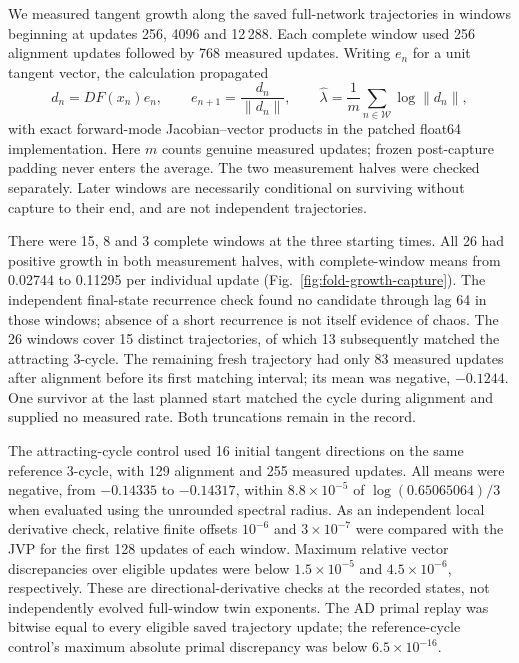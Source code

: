 \documentclass[11pt,letterpaper]{article}
\begin{document}
We measured tangent growth along the saved full-network trajectories in windows beginning at updates
256, 4096 and 12\,288. Each complete window used 256 alignment updates followed by 768 measured updates.
Writing $e_n$ for a unit tangent vector, the calculation propagated
\begin{equation}
 d_n=DF(x_n)e_n,\qquad e_{n+1}=\frac{d_n}{\|d_n\|},\qquad
 \widehat\lambda=\frac1m\sum_{n\in\mathcal W}\log\|d_n\|,
 \label{eq:fgr3-tangent}
\end{equation}
with exact forward-mode Jacobian--vector products in the patched float64 implementation. Here $m$ counts
genuine measured updates; frozen post-capture padding never enters the average. The two measurement halves
were checked separately. Later windows are necessarily conditional on surviving without capture to their
end, and are not independent trajectories.

There were 15, 8 and 3 complete windows at the three starting times. All 26 had positive growth in both
measurement halves, with complete-window means from 0.02744 to 0.11295 per individual update
(Fig.~\ref{fig:fold-growth-capture}). The independent final-state recurrence check found no candidate through
lag 64 in those windows; absence of a short recurrence is not itself evidence of chaos. The 26 windows
cover 15 distinct trajectories, of which 13 subsequently matched the attracting 3-cycle. The remaining
fresh trajectory had only 83 measured updates after alignment before its first matching interval; its
mean was negative, $-0.1244$. One survivor at the last planned start matched the cycle during alignment
and supplied no measured rate. Both truncations remain in the record.

The attracting-cycle control used 16 initial tangent directions on the same reference 3-cycle, with 129
alignment and 255 measured updates. All means were negative, from $-0.14335$ to $-0.14317$, within
$8.8\times10^{-5}$ of $\log(0.65065064)/3$ when evaluated using the unrounded spectral radius. As an
independent local derivative check, relative finite offsets $10^{-6}$ and $3\times10^{-7}$ were compared
with the JVP for the first 128 updates of each window. Maximum relative vector discrepancies over eligible
updates were below $1.5\times10^{-5}$ and $4.5\times10^{-6}$, respectively. These are directional-derivative
checks at the recorded states, not independently evolved full-window twin exponents. The AD primal replay
was bitwise equal to every eligible saved trajectory update; the reference-cycle control's maximum absolute
primal discrepancy was below $6.5\times10^{-16}$.
\end{document}
